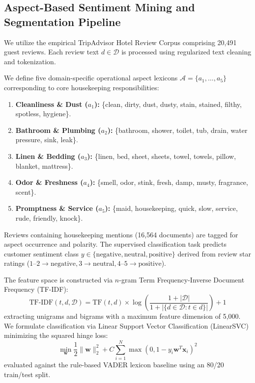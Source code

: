 \documentclass[11pt,a4paper]{article}
\begin{document}
\subsection{Aspect-Based Sentiment Mining and Segmentation Pipeline}
We utilize the empirical TripAdvisor Hotel Review Corpus comprising 20,491 guest reviews. Each review text $d \in \mathcal{D}$ is processed using regularized text cleaning and tokenization. 

We define five domain-specific operational aspect lexicons $\mathcal{A} = \{a_1, \dots, a_5\}$ corresponding to core housekeeping responsibilities:
\begin{enumerate}
    \item \textbf{Cleanliness \& Dust ($a_1$):} \{clean, dirty, dust, dusty, stain, stained, filthy, spotless, hygiene\}.
    \item \textbf{Bathroom \& Plumbing ($a_2$):} \{bathroom, shower, toilet, tub, drain, water pressure, sink, leak\}.
    \item \textbf{Linen \& Bedding ($a_3$):} \{linen, bed, sheet, sheets, towel, towels, pillow, blanket, mattress\}.
    \item \textbf{Odor \& Freshness ($a_4$):} \{smell, odor, stink, fresh, damp, musty, fragrance, scent\}.
    \item \textbf{Promptness \& Service ($a_5$):} \{maid, housekeeping, quick, slow, service, rude, friendly, knock\}.
\end{enumerate}

Reviews containing housekeeping mentions (16,564 documents) are tagged for aspect occurrence and polarity. The supervised classification task predicts customer sentiment class $y \in \{\text{negative}, \text{neutral}, \text{positive}\}$ derived from review star ratings ($1\text{--}2 \rightarrow \text{negative}, 3 \rightarrow \text{neutral}, 4\text{--}5 \rightarrow \text{positive}$).

The feature space is constructed via $n$-gram Term Frequency-Inverse Document Frequency (TF-IDF):
\begin{equation}
\text{TF-IDF}(t, d, \mathcal{D}) = \text{TF}(t, d) \times \log\left(\frac{1 + |\mathcal{D}|}{1 + |\{d \in \mathcal{D} : t \in d\}|}\right) + 1
\end{equation}
extracting unigrams and bigrams with a maximum feature dimension of 5,000. We formulate classification via Linear Support Vector Classification (LinearSVC) \cite{joachims1998} minimizing the squared hinge loss:
\begin{equation}
\min_{\mathbf{w}} \frac{1}{2} \|\mathbf{w}\|_2^2 + C \sum_{i=1}^N \max(0, 1 - y_i \mathbf{w}^T \mathbf{x}_i)^2
\end{equation}
evaluated against the rule-based VADER lexicon baseline \cite{hutto2014} using an 80/20 train/test split.
\end{document}

